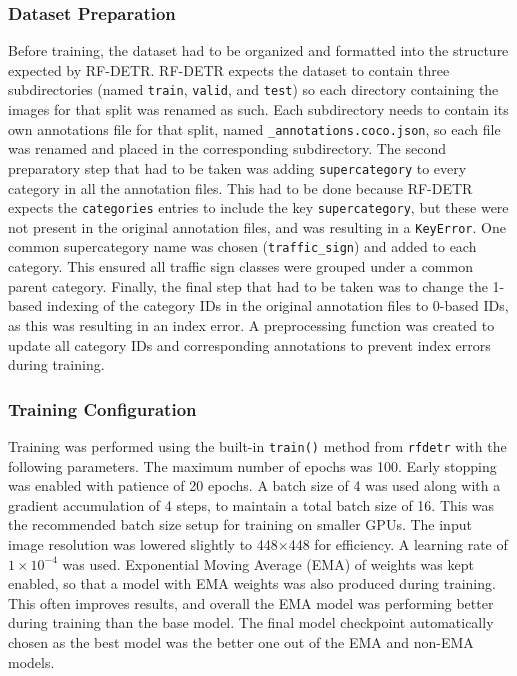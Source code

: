 \documentclass{article}
\begin{document}
\subsubsection*{Dataset Preparation}
Before training, the dataset had to be organized and formatted into the structure expected by RF-DETR. RF-DETR expects the dataset to contain three subdirectories (named \verb|train|, \verb|valid|, and \verb|test|) so each directory containing the images for that split was renamed as such. Each subdirectory needs to contain its own annotations file for that split, named \verb|_annotations.coco.json|, so each file was renamed and placed in the corresponding subdirectory. The second preparatory step that had to be taken was adding \verb|supercategory| to every category in all the annotation files. This had to be done because RF-DETR expects the \verb|categories| entries to include the key \verb|supercategory|, but these were not present in the original annotation files, and was resulting in a \verb|KeyError|. One common supercategory name was chosen (\verb|traffic_sign|) and added to each category. This ensured all traffic sign classes were grouped under a common parent category. Finally, the final step that had to be taken was to change the 1-based indexing of the category IDs in the original annotation files to 0-based IDs, as this was resulting in an index error. A preprocessing function was created to update all category IDs and corresponding annotations to prevent index errors during training.

\subsubsection*{Training Configuration} Training was performed using the built-in \verb|train()| method from \verb|rfdetr| with the following parameters. The maximum number of epochs was 100. Early stopping was enabled with patience of 20 epochs. A batch size of 4 was used along with a gradient accumulation of 4 steps, to maintain a total batch size of 16. This was the recommended batch size setup for training on smaller GPUs. The input image resolution was lowered slightly to 448$\times$448 for efficiency. A learning rate of $1 \times 10^{-4}$ was used. Exponential Moving Average (EMA) of weights was kept enabled, so that a model with EMA weights was also produced during training. This often improves results, and overall the EMA model was performing better during training than the base model. The final model checkpoint automatically chosen as the best model was the better one out of the EMA and non-EMA models.
\end{document}
